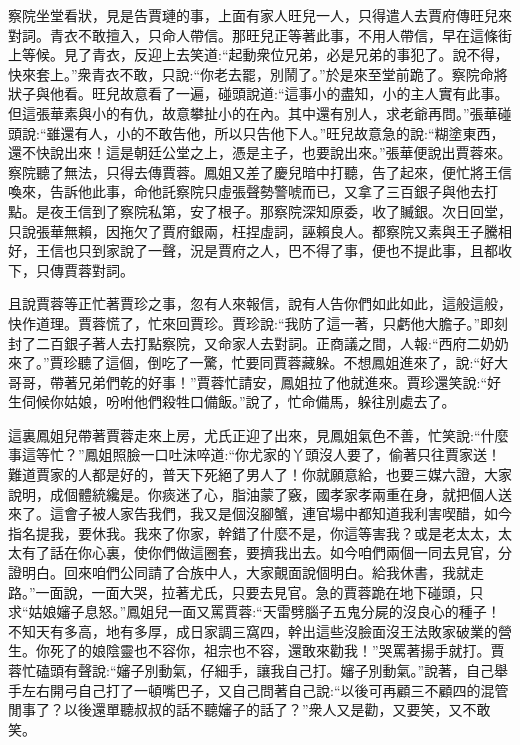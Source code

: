\begin{parag}
    察院坐堂看狀，見是告賈璉的事，上面有家人旺兒一人，只得遣人去賈府傳旺兒來對詞。青衣不敢擅入，只命人帶信。那旺兒正等著此事，不用人帶信，早在這條街上等候。見了青衣，反迎上去笑道:“起動衆位兄弟，必是兄弟的事犯了。說不得，快來套上。”衆青衣不敢，只說:“你老去罷，別鬧了。”於是來至堂前跪了。察院命將狀子與他看。旺兒故意看了一遍，碰頭說道:“這事小的盡知，小的主人實有此事。但這張華素與小的有仇，故意攀扯小的在內。其中還有別人，求老爺再問。”張華碰頭說:“雖還有人，小的不敢告他，所以只告他下人。”旺兒故意急的說:“糊塗東西，還不快說出來！這是朝廷公堂之上，憑是主子，也要說出來。”張華便說出賈蓉來。察院聽了無法，只得去傳賈蓉。鳳姐又差了慶兒暗中打聽，告了起來，便忙將王信喚來，告訴他此事，命他託察院只虛張聲勢警唬而已，又拿了三百銀子與他去打點。是夜王信到了察院私第，安了根子。那察院深知原委，收了贓銀。次日回堂，只說張華無賴，因拖欠了賈府銀兩，枉捏虛詞，誣賴良人。都察院又素與王子騰相好，王信也只到家說了一聲，況是賈府之人，巴不得了事，便也不提此事，且都收下，只傳賈蓉對詞。
\end{parag}


\begin{parag}
    且說賈蓉等正忙著賈珍之事，忽有人來報信，說有人告你們如此如此，這般這般，快作道理。賈蓉慌了，忙來回賈珍。賈珍說:“我防了這一著，只虧他大膽子。”即刻封了二百銀子著人去打點察院，又命家人去對詞。正商議之間，人報:“西府二奶奶來了。”賈珍聽了這個，倒吃了一驚，忙要同賈蓉藏躲。不想鳳姐進來了，說:“好大哥哥，帶著兄弟們乾的好事！”賈蓉忙請安，鳳姐拉了他就進來。賈珍還笑說:“好生伺候你姑娘，吩咐他們殺牲口備飯。”說了，忙命備馬，躲往別處去了。
\end{parag}


\begin{parag}
    這裏鳳姐兒帶著賈蓉走來上房，尤氏正迎了出來，見鳳姐氣色不善，忙笑說:“什麼事這等忙？”鳳姐照臉一口吐沫啐道:“你尤家的丫頭沒人要了，偷著只往賈家送！難道賈家的人都是好的，普天下死絕了男人了！你就願意給，也要三媒六證，大家說明，成個體統纔是。你痰迷了心，脂油蒙了竅，國孝家孝兩重在身，就把個人送來了。這會子被人家告我們，我又是個沒腳蟹，連官場中都知道我利害喫醋，如今指名提我，要休我。我來了你家，幹錯了什麼不是，你這等害我？或是老太太，太太有了話在你心裏，使你們做這圈套，要擠我出去。如今咱們兩個一同去見官，分證明白。回來咱們公同請了合族中人，大家覿面說個明白。給我休書，我就走路。”一面說，一面大哭，拉著尤氏，只要去見官。急的賈蓉跪在地下碰頭，只求“姑娘嬸子息怒。”鳳姐兒一面又罵賈蓉:“天雷劈腦子五鬼分屍的沒良心的種子！不知天有多高，地有多厚，成日家調三窩四，幹出這些沒臉面沒王法敗家破業的營生。你死了的娘陰靈也不容你，祖宗也不容，還敢來勸我！”哭罵著揚手就打。賈蓉忙磕頭有聲說:“嬸子別動氣，仔細手，讓我自己打。嬸子別動氣。”說著，自己舉手左右開弓自己打了一頓嘴巴子，又自己問著自己說:“以後可再顧三不顧四的混管閒事了？以後還單聽叔叔的話不聽嬸子的話了？”衆人又是勸，又要笑，又不敢笑。
\end{parag}


